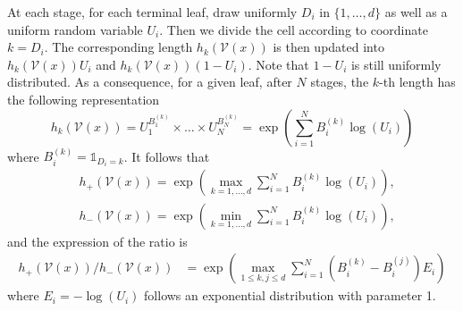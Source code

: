 \documentclass[paper=a4, fontsize=11pt]{scrartcl}
\newcommand{\ind}{\mathds{1}}
\begin{document}
At each stage, for each terminal leaf, draw uniformly $D_i $ in $\{1,\ldots, d\}$ as well as a uniform random variable $U_i$. Then we divide the cell according to coordinate $k = D_i$. The corresponding length $h_k(\mathcal V (x) )$ is then updated into $h_k(\mathcal V (x) ) U_i$ and $h_k(\mathcal V (x) ) (1-U_i)$. Note that $1-U_i$ is still uniformly distributed. As a consequence, for a given leaf, after $N$ stages,  the $k$-th length has the following representation 
$$ h _ k(\mathcal V (x) ) = U_1^{B_1^{(k)}}\times \ldots \times U_N^{B_N^{(k)}} = \exp\left( \sum_{i=1} ^ N B_i^{(k)} \log(U_i) \right)  $$
where $B_i^{(k)}  = \ind_{D_i = k }$. It follows that
\begin{align*}
 &h_+(\mathcal V (x) ) = \exp\left( \max_{k=1,\ldots, d}  \sum_{i=1} ^ N B_i^{(k)} \log(U_i) \right), \\
 &h_-(\mathcal V (x) ) =  \exp\left(\min_{k=1,\ldots, d}  \sum_{i=1} ^ N B_i^{(k)} \log(U_i) \right), 
\end{align*}
and the expression of the ratio is
\begin{align*}
 h_+(\mathcal V (x) )/h_-(\mathcal V (x) )  &= \exp \left(   \max_{1 \leq k,j \leq d} \sum_{i=1} ^N (B_i^{(k)} - B_i^{(j)} ) E_i \right) \end{align*}
 where $E_i = - \log(U_i)$ follows an exponential distribution with parameter 1.
\end{document}

